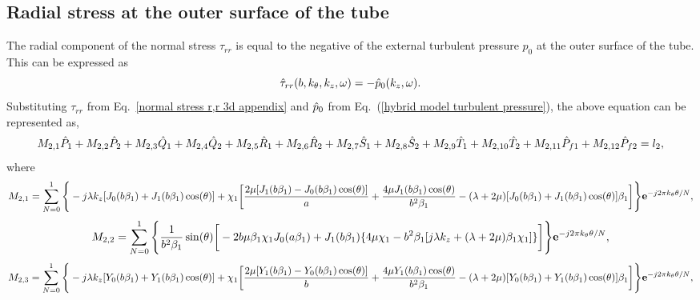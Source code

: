 \documentclass[10pt]{asme2ej}
\begin{document}
\begin{landscape}
\subsection{Radial stress at the outer surface of the tube}\label{BC2 3d appendix}
The radial component of the normal stress $\tau_{rr}$ is equal to the negative of the external turbulent pressure $p_0$ at the outer surface of the tube. This can be expressed as
\begin{equation}
        \Hat{\tau}_{rr}(b,k_\theta,k_{z},\omega)= -\Hat{p}_{0}(k_{z},\omega).
\end{equation}
Substituting $\tau_{rr}$ from Eq.~\ref{normal stress r,r 3d appendix} and $\Hat{p}_{0}$ from Eq.~(\ref{hybrid model turbulent pressure}), the above equation can be represented as, 
\begin{equation}\label{BC2 equation 3d appendix}
    M_{2,1}\Hat{P}_1 + M_{2,2}\Hat{P}_2 + M_{2,3}\Hat{Q}_1 + M_{2,4}\Hat{Q}_2 + M_{2,5}\Hat{R}_1 +  M_{2,6}\Hat{R}_2 + M_{2,7}\Hat{S}_1\\ + M_{2,8}\Hat{S}_2 + M_{2,9}\Hat{T}_1 + M_{2,10}\Hat{T}_2 + M_{2,11}\Hat{P}_{f1} + M_{2,12}\Hat{P}_{f2} = l_2,
\end{equation}
where
\begin{equation}
    M_{2,1} = \sum_{N=0}^{1}\Bigg\{-j\lambda k_z[J_0(b\beta_1)+J_1(b\beta_1)\cos(\theta)]\\ + \chi_1 \bigg[\frac{2\mu[J_1(b\beta_1)-J_0(b\beta_1)\cos(\theta)]}{a}\\ + \frac{4\mu J_1(b\beta_1)\cos(\theta)}{b^2 \beta_1} - (\lambda+2\mu)[J_0(b\beta_1)+J_1(b\beta_1)\cos(\theta)]\beta_1 \bigg]\Bigg\}\mathbf{e}^{-j2\pi k_\theta\theta/N},
\end{equation}
\begin{equation}
    M_{2,2} = \sum_{N=0}^{1}\Bigg\{\frac{1}{b^2\beta_1}\sin(\theta)\bigg[-2b\mu \beta_1 \chi_1 J_0(a\beta_1)\\ + J_1(b\beta_1)\{4\mu \chi_1-b^2\beta_1[j\lambda k_z + (\lambda+2\mu)\beta_1 \chi_1]\}\bigg]\Bigg\}\mathbf{e}^{-j2\pi k_\theta\theta/N},
\end{equation}
\begin{equation}
    M_{2,3} = \sum_{N=0}^{1}\Bigg\{-j\lambda k_z[Y_0(b\beta_1)+Y_1(b\beta_1)\cos(\theta)]\\ + \chi_1 \bigg[\frac{2\mu[Y_1(b\beta_1)-Y_0(b\beta_1)\cos(\theta)]}{b}\\ + \frac{4\mu Y_1(b\beta_1)\cos(\theta)}{b^2 \beta_1} - (\lambda+2\mu)[Y_0(b\beta_1)+Y_1(b\beta_1)\cos(\theta)]\beta_1 \bigg]\Bigg\}\mathbf{e}^{-j2\pi k_\theta\theta/N},

\end{equation}
\end{landscape}
\end{document}
